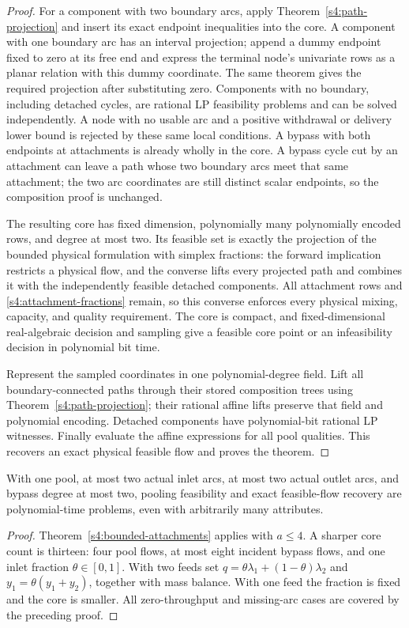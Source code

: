 \begin{proof}
For a component with two boundary arcs, apply
Theorem~\ref{s4:path-projection} and insert its exact endpoint
inequalities into the core. A component with one boundary arc has
an interval projection; append a dummy endpoint fixed to zero at its
free end and express the terminal node's univariate rows as a
planar relation with this dummy coordinate. The same theorem gives
the required projection after substituting zero. Components with no
boundary, including detached cycles, are rational LP feasibility
problems and can be solved independently. A node with no usable arc
and a positive withdrawal or delivery lower bound is rejected by
these same local conditions. A bypass with both endpoints at
attachments is already wholly in the core. A bypass cycle cut by
an attachment can leave a path whose two boundary arcs meet that
same attachment; the two arc coordinates are still distinct scalar
endpoints, so the composition proof is unchanged.

The resulting core has fixed dimension, polynomially many
polynomially encoded rows, and degree at most two. Its feasible set
is exactly the projection of the bounded physical formulation with
simplex fractions: the forward implication restricts a physical
flow, and the converse lifts every projected path and combines it
with the independently feasible detached components. All attachment
rows and \eqref{s4:attachment-fractions} remain, so this converse
enforces every physical mixing, capacity, and quality requirement.
The core is compact, and fixed-dimensional real-algebraic decision
and sampling give a feasible core point or an infeasibility decision
in polynomial bit time.

Represent the sampled coordinates in one polynomial-degree field.
Lift all boundary-connected paths through their stored composition
trees using Theorem~\ref{s4:path-projection}; their rational affine
lifts preserve that field and polynomial encoding. Detached components
have polynomial-bit rational LP witnesses. Finally evaluate the affine
expressions for all pool qualities. This recovers an exact physical
feasible flow and proves the theorem.
\end{proof}

\begin{corollary}\label{s4:two-two-feasibility}
With one pool, at most two actual inlet arcs, at most two actual outlet
arcs, and bypass degree at most two, pooling feasibility and exact
feasible-flow recovery are polynomial-time problems, even with
arbitrarily many attributes.
\end{corollary}
\begin{proof}
Theorem~\ref{s4:bounded-attachments} applies with $a\le4$. A sharper
core count is thirteen: four pool flows, at most eight incident bypass
flows, and one inlet fraction $\theta\in[0,1]$. With two feeds set
$q=\theta\lambda_1+(1-\theta)\lambda_2$ and
$y_1=\theta(y_1+y_2)$, together with mass balance. With one feed the
fraction is fixed and the core is smaller. All zero-throughput and
missing-arc cases are covered by the preceding proof.
\end{proof}

